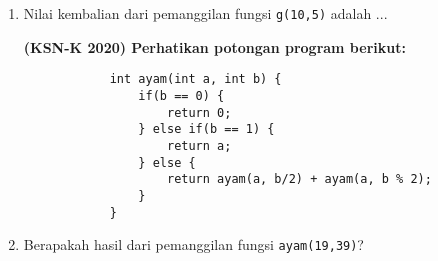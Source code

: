 \begin{enumerate}
		    \item  Nilai kembalian dari pemanggilan fungsi \verb*|g(10,5)| adalah ...
		    
		    \textbf{(KSN-K 2020) Perhatikan potongan program berikut:}
		    \begin{lstlisting}
		    int ayam(int a, int b) {
		    	if(b == 0) {
		    		return 0;
		    	} else if(b == 1) {
		    		return a;
		    	} else {
		    		return ayam(a, b/2) + ayam(a, b % 2);
		    	}
		    }
		    \end{lstlisting}
		    \item Berapakah hasil dari pemanggilan fungsi \verb*|ayam(19,39)|?
		    
		    \end{enumerate}
